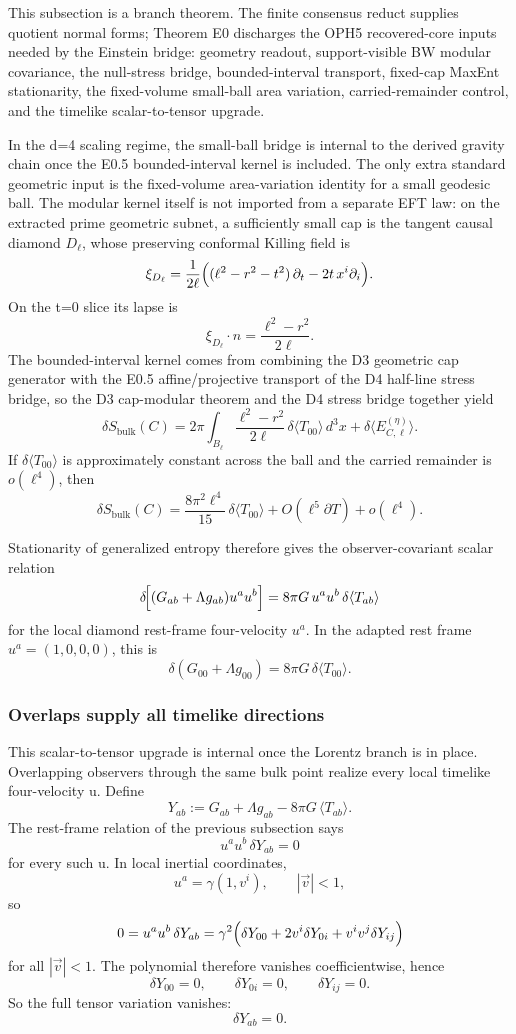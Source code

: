 This subsection is a branch theorem. The finite consensus reduct supplies quotient normal forms; Theorem E0 discharges the OPH5 recovered-core inputs needed by the Einstein bridge: geometry readout, support-visible BW modular covariance, the null-stress bridge, bounded-interval transport, fixed-cap MaxEnt stationarity, the fixed-volume small-ball area variation, carried-remainder control, and the timelike scalar-to-tensor upgrade.

In the d=4 scaling regime, the small-ball bridge is internal to the derived gravity chain once the E0.5 bounded-interval kernel is included. The only extra standard geometric input is the fixed-volume area-variation identity for a small geodesic ball. The modular kernel itself is not imported from a separate EFT law: on the extracted prime geometric subnet, a sufficiently small cap is the tangent causal diamond \(D_\ell\), whose preserving conformal Killing field is
\[
\xi_{D_\ell}
=
\frac{1}{2\ell}
\Bigl((\ell^2-r^2-t^2)\,\partial_t-2t\,x^i\partial_i\Bigr).
\]
On the t=0 slice its lapse is
\[
\xi_{D_\ell}\!\cdot n=\frac{\ell^2-r^2}{2\ell}.
\]
The bounded-interval kernel comes from combining the D3 geometric cap generator with the E0.5 affine/projective transport of the D4 half-line stress bridge, so the D3 cap-modular theorem and the D4 stress bridge together yield
\[
\delta S_{\mathrm{bulk}}(C)
=
2\pi\int_{B_\ell}\frac{\ell^2-r^2}{2\ell}\,\delta\langle T_{00}\rangle\,d^3x
+
\delta\langle E^{(\eta)}_{C,\ell}\rangle.
\]
If \(\delta\langle T_{00}\rangle\) is approximately constant across the ball and the carried remainder is \(o(\ell^4)\), then
\[
\delta S_{\mathrm{bulk}}(C)
=
\frac{8\pi^2\ell^4}{15}\,\delta\langle T_{00}\rangle
+O(\ell^5\partial T)+o(\ell^4).
\]

Stationarity of generalized entropy therefore gives the observer-covariant scalar relation
\[
\delta\!\Bigl[(G_{ab}+\Lambda g_{ab})u^a u^b\Bigr]
=
8\pi G\,u^a u^b\,\delta\langle T_{ab}\rangle
\]
for the local diamond rest-frame four-velocity \(u^a\). In the adapted rest frame \(u^a=(1,0,0,0)\), this is
\[
\delta\!\left(G_{00}+\Lambda g_{00}\right)=8\pi G\,\delta\langle T_{00}\rangle.
\]

\subsubsection{Overlaps supply all timelike directions}\label{57-overlaps-supply-all-timelike-directions}

This scalar-to-tensor upgrade is internal once the Lorentz branch is in place. Overlapping observers through the same bulk point realize every local timelike four-velocity u. Define
\[
Y_{ab}:=G_{ab}+\Lambda g_{ab}-8\pi G\,\langle T_{ab}\rangle.
\]
The rest-frame relation of the previous subsection says
\[
u^a u^b\,\delta Y_{ab}=0
\]
for every such u. In local inertial coordinates,
\[
u^a=\gamma(1,v^i),
\qquad
|\vec v|<1,
\]
so
\[
0
=
u^a u^b\,\delta Y_{ab}
=
\gamma^2\Bigl(\delta Y_{00}+2v^i\delta Y_{0i}+v^iv^j\delta Y_{ij}\Bigr)
\]
for all \(|\vec v|<1\). The polynomial therefore vanishes coefficientwise, hence
\[
\delta Y_{00}=0,\qquad
\delta Y_{0i}=0,\qquad
\delta Y_{ij}=0.
\]
So the full tensor variation vanishes:
\[
\delta Y_{ab}=0.
\]


